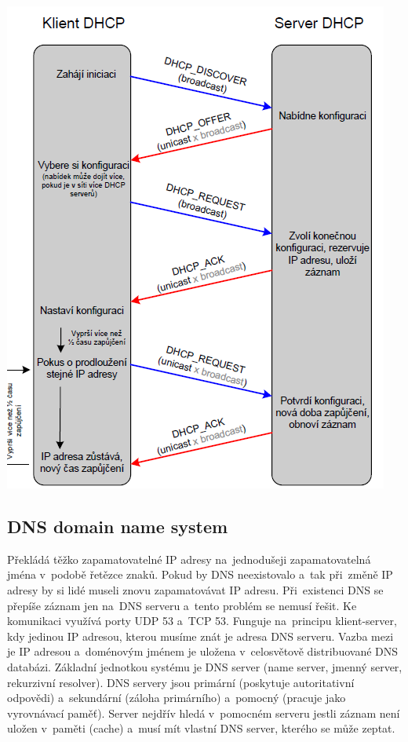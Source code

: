 \begin{center}
\includegraphics[scale = 0.8]{images/dhcp.png}
\end{center}

\subsection{DNS domain name system}

Překládá těžko zapamatovatelné IP adresy na~jednodušeji zapamatovatelná jména v~podobě řetězce znaků. Pokud by DNS neexistovalo a~tak při~změně IP adresy by si lidé museli znovu zapamatovávat IP adresu. Při~existenci DNS se přepíše záznam jen na~DNS serveru a~tento problém se nemusí řešit. Ke komunikaci využívá porty UDP 53 a~TCP 53. Funguje na~principu klient-server, kdy jedinou IP adresou, kterou musíme znát je adresa DNS serveru. Vazba mezi je IP adresou a~doménovým jménem je uložena v~celosvětově distribuované DNS databázi. Základní jednotkou systému je DNS server (name server, jmenný server, rekurzivní resolver). DNS servery jsou primární (poskytuje autoritativní odpovědi) a~sekundární (záloha primárního) a~pomocný (pracuje jako vyrovnávací paměť). Server nejdřív hledá v~pomocném serveru jestli záznam není uložen v~paměti (cache) a~musí mít vlastní DNS server, kterého se může zeptat.


